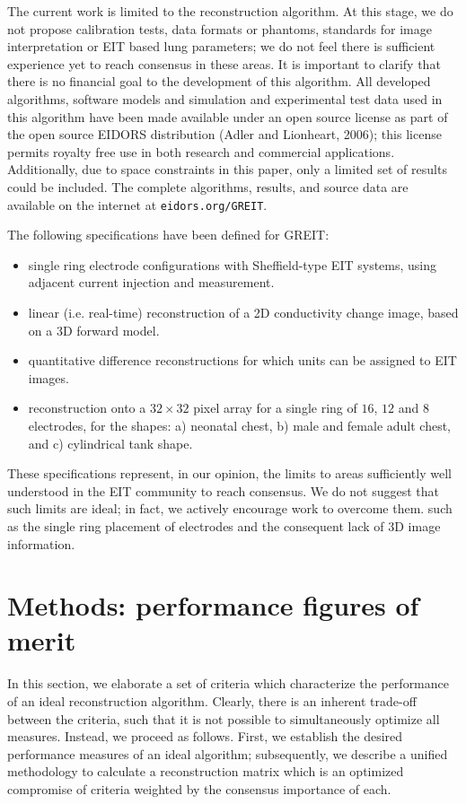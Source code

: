 \documentclass[12pt]{iopart}
\begin{document}
The current work is limited to the reconstruction algorithm.
At this stage, we do not propose calibration tests, data
 formats or phantoms, standards
for image interpretation or EIT based lung parameters; 
we do not feel there is sufficient experience yet to reach
consensus in these areas.
It is important to clarify that there is no financial
goal to the development of this algorithm.
All developed algorithms, software
models and simulation and experimental test data used
in this algorithm have been
made available under an open source license as part of
the open source EIDORS distribution (Adler and Lionheart, 2006);
this license permits
royalty free use in both research and commercial applications.
Additionally, due to space constraints in this paper, only a
limited set of results could be included. The complete
algorithms, results, and source data are available on the 
internet at \verb+eidors.org/GREIT+.



The following specifications have been defined for GREIT:
\begin{itemize}
\item
 single ring electrode
configurations with Sheffield-type EIT systems, using
      adjacent current injection and measurement.
\item
 linear (i.e. real-time) reconstruction of a 2D conductivity
change image, based on a 3D forward model.
\item
 quantitative difference reconstructions for which units can
  be assigned to EIT images.
\item
 reconstruction onto 
      a $32\times 32$ pixel array
      for a single ring of $16$, $12$ and $8$ 
      electrodes, for the shapes:
   a) neonatal chest, 
   b) male and female adult chest, and
   c) cylindrical tank shape.
\end{itemize}

These specifications represent, in our opinion, the limits
to areas sufficiently well understood in the EIT community
to reach consensus. We do not suggest that such limits are ideal;
in fact, we actively encourage work to overcome them.
such as the single ring placement of electrodes and the consequent
lack of 3D image information. 

\section{Methods: performance figures of merit}
\label{sec:figmerit}

In this section, we elaborate a set of criteria which 
characterize the performance of an ideal reconstruction
algorithm. Clearly, there is an inherent trade-off between
the criteria, such that it is not possible to 
simultaneously optimize all measures. Instead, we proceed
as follows. First, we establish the desired performance measures
of an ideal algorithm; subsequently, 
we describe a unified methodology to calculate a reconstruction
matrix which is an optimized compromise of criteria
weighted by the consensus importance of each.  
\end{document}
